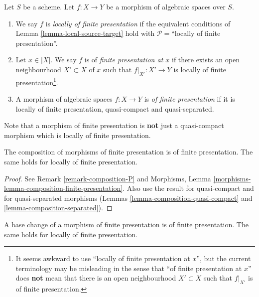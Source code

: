 \begin{definition}
\label{definition-locally-finite-presentation}
Let $S$ be a scheme.
Let $f : X \to Y$ be a morphism of algebraic spaces over $S$.
\begin{enumerate}
\item We say $f$ is {\it locally of finite presentation} if
the equivalent conditions of
Lemma \ref{lemma-local-source-target}
hold with $\mathcal{P} =$``locally of finite presentation''.
\item Let $x \in |X|$. We say $f$ is of {\it finite presentation at $x$}
if there exists an open neighbourhood $X' \subset X$ of $x$ such
that $f|_{X'} : X' \to Y$ is locally of finite
presentation\footnote{It seems awkward to use ``locally of finite presentation
at $x$'', but the current terminology may be misleading in the sense that
``of finite presentation at $x$'' does {\bf not} mean that there is
an open neighbourhood $X' \subset X$ such that $f|_{X'}$ is of finite
presentation.}.
\item A morphism of algebraic spaces $f : X \to Y$ is
{\it of finite presentation}
if it is locally of finite presentation, quasi-compact and
quasi-separated.
\end{enumerate}
\end{definition}

\noindent
Note that a morphism of finite presentation is {\bf not} just a quasi-compact
morphism which is locally of finite presentation.

\begin{lemma}
\label{lemma-composition-finite-presentation}
The composition of morphisms of finite presentation is of finite presentation.
The same holds for locally of finite presentation.
\end{lemma}

\begin{proof}
See Remark \ref{remark-composition-P} and
Morphisms, Lemma \ref{morphisms-lemma-composition-finite-presentation}.
Also use the result for quasi-compact and for quasi-separated morphisms
(Lemmas \ref{lemma-composition-quasi-compact} and
\ref{lemma-composition-separated}).
\end{proof}

\begin{lemma}
\label{lemma-base-change-finite-presentation}
A base change of a morphism of finite presentation is of finite presentation.
The same holds for locally of finite presentation.
\end{lemma}


